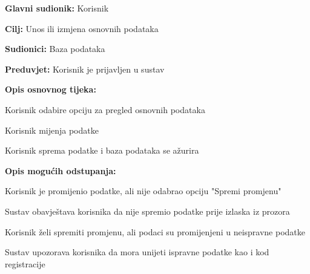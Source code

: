 				\noindent {}
				\begin{packed_item}
					
					\item \textbf{Glavni sudionik: } Korisnik
					\item  \textbf{Cilj:} Unos ili izmjena osnovnih podataka
					\item  \textbf{Sudionici:} Baza podataka
					\item  \textbf{Preduvjet:} Korisnik je prijavljen u sustav
					\item  \textbf{Opis osnovnog tijeka:}
					
					\item[] \begin{packed_enum}
						
						\item Korisnik odabire opciju za pregled osnovnih podataka
						\item Korisnik mijenja podatke
						\item Korisnik sprema podatke i baza podataka se ažurira
					\end{packed_enum}
					
					\item  \textbf{Opis mogućih odstupanja:}
					
					\item[] \begin{packed_item}
						
						\item[2.a] Korisnik je promijenio podatke, ali nije odabrao opciju "Spremi promjenu"
						\item[] \begin{packed_enum}
							\item Sustav obavještava korisnika da nije spremio podatke prije izlaska iz prozora 
						\end{packed_enum}
						
						\item[3.a] Korisnik želi spremiti promjenu, ali podaci su promijenjeni u neispravne podatke
						\item[] \begin{packed_enum}
							\item Sustav upozorava korisnika da mora unijeti ispravne podatke kao i kod registracije
						\end{packed_enum}
						
					\end{packed_item}
				\end{packed_item}
				
